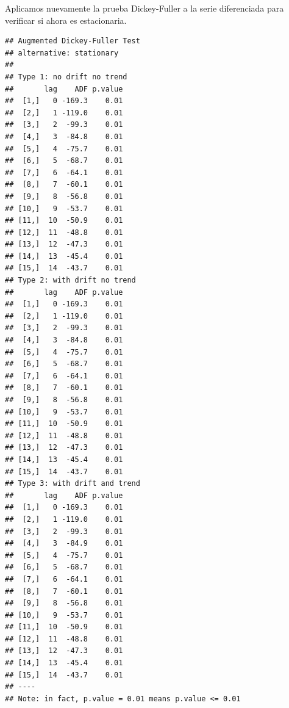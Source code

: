 \documentclass[
]{book}
\begin{document}
Aplicamos nuevamente la prueba Dickey-Fuller a la serie diferenciada para verificar si ahora es estacionaria.

\begin{verbatim}
## Augmented Dickey-Fuller Test 
## alternative: stationary 
##  
## Type 1: no drift no trend 
##       lag    ADF p.value
##  [1,]   0 -169.3    0.01
##  [2,]   1 -119.0    0.01
##  [3,]   2  -99.3    0.01
##  [4,]   3  -84.8    0.01
##  [5,]   4  -75.7    0.01
##  [6,]   5  -68.7    0.01
##  [7,]   6  -64.1    0.01
##  [8,]   7  -60.1    0.01
##  [9,]   8  -56.8    0.01
## [10,]   9  -53.7    0.01
## [11,]  10  -50.9    0.01
## [12,]  11  -48.8    0.01
## [13,]  12  -47.3    0.01
## [14,]  13  -45.4    0.01
## [15,]  14  -43.7    0.01
## Type 2: with drift no trend 
##       lag    ADF p.value
##  [1,]   0 -169.3    0.01
##  [2,]   1 -119.0    0.01
##  [3,]   2  -99.3    0.01
##  [4,]   3  -84.8    0.01
##  [5,]   4  -75.7    0.01
##  [6,]   5  -68.7    0.01
##  [7,]   6  -64.1    0.01
##  [8,]   7  -60.1    0.01
##  [9,]   8  -56.8    0.01
## [10,]   9  -53.7    0.01
## [11,]  10  -50.9    0.01
## [12,]  11  -48.8    0.01
## [13,]  12  -47.3    0.01
## [14,]  13  -45.4    0.01
## [15,]  14  -43.7    0.01
## Type 3: with drift and trend 
##       lag    ADF p.value
##  [1,]   0 -169.3    0.01
##  [2,]   1 -119.0    0.01
##  [3,]   2  -99.3    0.01
##  [4,]   3  -84.9    0.01
##  [5,]   4  -75.7    0.01
##  [6,]   5  -68.7    0.01
##  [7,]   6  -64.1    0.01
##  [8,]   7  -60.1    0.01
##  [9,]   8  -56.8    0.01
## [10,]   9  -53.7    0.01
## [11,]  10  -50.9    0.01
## [12,]  11  -48.8    0.01
## [13,]  12  -47.3    0.01
## [14,]  13  -45.4    0.01
## [15,]  14  -43.7    0.01
## ---- 
## Note: in fact, p.value = 0.01 means p.value <= 0.01
\end{verbatim}
\end{document}
